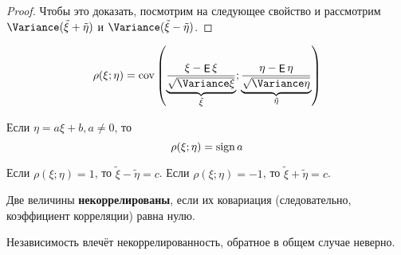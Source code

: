 \documentclass{article}
\DeclareMathOperator{\Expected}{\mathsf{E}}
\DeclareMathOperator{\Covariance}{cov}
\begin{document}
    \begin{proof}
        Чтобы это доказать, посмотрим на следующее свойство и рассмотрим $\Variance(\tilde\xi+\tilde\eta)$ и $\Variance(\tilde\xi-\tilde\eta)$.
    \end{proof}
    \begin{property}
        $$
        \rho(\xi;\eta)=\Covariance\left(\underbrace{\frac{\xi-\Expected\xi}{\sqrt{\Variance\xi}}}_{\tilde\xi};\underbrace{\frac{\eta-\Expected\eta}{\sqrt{\Variance\eta}}}_{\tilde\eta}\right)
        $$
    \end{property}
    \begin{property}
        Если $\eta=a\xi+b,a\neq0$, то
        $$
        \rho(\xi;\eta)=\operatorname{sign} a
        $$
    \end{property}
    \begin{property}
        Если $\rho(\xi;\eta)=1$, то $\tilde\xi-\tilde\eta=c$.
        Если $\rho(\xi;\eta)=-1$, то $\tilde\xi+\tilde\eta=c$.
    \end{property}
    \begin{definition}
        Две величины \textbf{некоррелированы}, если их ковариация (следовательно, коэффициент корреляции) равна нулю.
    \end{definition}
    \begin{claim}
        Независимость влечёт некоррелированность, обратное в общем случае неверно.
    \end{claim}
\end{document}
